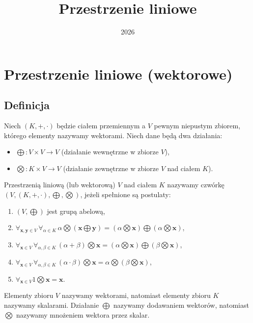 \documentclass{article}
\title{Przestrzenie liniowe}
\date{2026}
\begin{document}
\maketitle

\section{Przestrzenie liniowe (wektorowe)}
\subsection{Definicja}
Niech $(K,+,\cdot)$ będzie ciałem przemiennym a $V$ pewnym niepustym zbiorem, którego elementy nazywamy wektorami.
Niech dane będą dwa działania:
\begin{itemize}
    \item $\bigoplus : V \times V \rightarrow V$ (działanie wewnętrzne w zbiorze $V$),
    \item $\bigotimes : K \times V \rightarrow V$ (działanie zewnętrzne w zbiorze $V$ nad ciałem $K$).
\end{itemize}
Przestrzenią liniową (lub wektorową) $V$ nad ciałem $K$ nazywamy czwórkę $\left( V, (K,+,\cdot), \bigoplus, \bigotimes \right)$, jeżeli spełnione są postulaty:
\begin{enumerate}
    \item $(V, \bigoplus)$ jest grupą abelową,
    \item $\forall_{\mathbf{x},\mathbf{y} \in V}\,\forall_{\alpha \in K}\, \alpha\bigotimes(\mathbf{x}\bigoplus\mathbf{y}) = (\alpha\bigotimes\mathbf{x})\bigoplus(\alpha\bigotimes\mathbf{x})$,
    \item $\forall_{\mathbf{x} \in V}\,\forall_{\alpha, \beta \in K}\, (\alpha+\beta)\bigotimes\mathbf{x} = (\alpha\bigotimes\mathbf{x})\bigoplus(\beta\bigotimes\mathbf{x})$,
    \item $\forall_{\mathbf{x} \in V}\,\forall_{\alpha, \beta \in K}\, (\alpha\cdot\beta)\bigotimes\mathbf{x} = \alpha\bigotimes(\beta\bigotimes\mathbf{x})$,
    \item $\forall_{\mathbf{x} \in V} 1\bigotimes\mathbf{x}=\mathbf{x}$.
\end{enumerate}

Elementy zbioru $V$ nazywamy wektorami, natomiast elementy zbioru $K$ nazywamy skalarami.
Działanie $\bigoplus$ nazywamy dodawaniem wektorów, natomiast $\bigotimes$ nazywamy mnożeniem wektora przez skalar.
\end{document}
